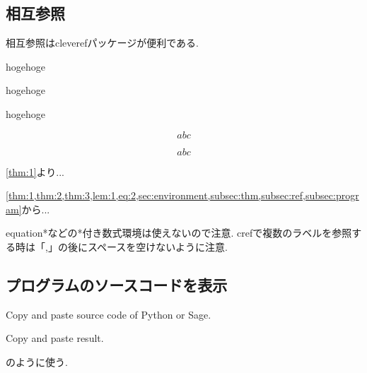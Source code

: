 \documentclass[11pt,a4paper,oneside,lualatex]{ltjsarticle} %
\numberwithin{equation}{section} %
\begin{document}

\subsection{相互参照} \label{subsec:ref}


相互参照はcleverefパッケージが便利である. 

\begin{thm} \label{thm:2}
	hogehoge
\end{thm}

\begin{thm} \label{thm:3}
	hogehoge
\end{thm}

\begin{lem} \label{lem:1}
	hogehoge
\end{lem}

\begin{equation} \label{eq:1}
	abc
\end{equation}

\begin{equation} \label{eq:2}
	abc
\end{equation}

\cref{thm:1}より... 

\cref{thm:1,thm:2,thm:3,lem:1,eq:2,sec:environment,subsec:thm,subsec:ref,subsec:program}から...

equation*などの*付き数式環境は使えないので注意.
crefで複数のラベルを参照する時は「,」の後にスペースを空けないように注意.


\subsection{プログラムのソースコードを表示} \label{subsec:program}


\begin{Python}
Copy and paste source code of Python or Sage.
\end{Python}
\begin{result}
Copy and paste result.
\end{result}
のように使う.
\end{document}
